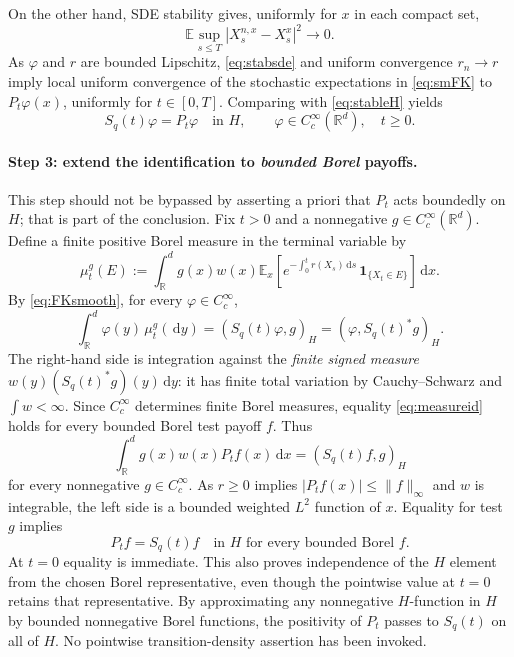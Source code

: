 \documentclass[11pt,a4paper]{article}
\theoremstyle{definition}\newtheorem{definition}{Definition}[section]\newtheorem{example}[theorem]{Example}
\theoremstyle{remark}\newtheorem{remark}[theorem]{Remark}\newtheorem{remarkSix}{Remark}[section]
\newcommand{\Rd}{\mathbb R^d}
\newcommand{\E}{\mathbb E}
\newcommand{\Cc}{C_c^\infty}
\newcommand{\dd}{\,\mathrm d}
\newcommand{\norm}[1]{\lVert #1\rVert}
\begin{document}
On the other hand, SDE stability gives, uniformly for $x$ in each compact set,
\begin{equation}\label{eq:stabsde}
 \E\sup_{s\le T}|X_s^{n,x}-X_s^x|^2\longrightarrow0.
\end{equation}
As $\varphi$ and $r$ are bounded Lipschitz, \eqref{eq:stabsde} and uniform convergence $r_n\to r$ imply local uniform convergence of the stochastic expectations in \eqref{eq:smFK} to $P_t\varphi(x)$, uniformly for $t\in[0,T]$. Comparing with \eqref{eq:stableH} yields
\begin{equation}\label{eq:FKsmooth}
 S_q(t)\varphi=P_t\varphi\quad\text{in }H,
 \qquad \varphi\in\Cc(\Rd),\quad t\ge0.
\end{equation}

\paragraph{Step 3: extend the identification to \emph{bounded Borel} payoffs.}
This step should not be bypassed by asserting a priori that $P_t$ acts boundedly on $H$; that is part of the conclusion. Fix $t>0$ and a nonnegative $g\in\Cc(\Rd)$. Define a finite positive Borel measure in the terminal variable by
\begin{equation}\label{eq:measuremu}
 \mu^g_t(E):=\int_\Rd g(x)w(x)\E_x\left[
 e^{-\int_0^t r(X_s)\dd s}\,\mathbf1_{\{X_t\in E\}}
 \right]\dd x.
\end{equation}
By \eqref{eq:FKsmooth}, for every $\varphi\in\Cc$,
\begin{equation}\label{eq:measureid}
 \int_\Rd\varphi(y)\,\mu_t^g(\dd y)
 =(S_q(t)\varphi,g)_H
 =(\varphi,S_q(t)^*g)_H.
\end{equation}
The right-hand side is integration against the \emph{finite signed measure} $w(y)(S_q(t)^*g)(y)\dd y$: it has finite total variation by Cauchy--Schwarz and $\int w<\infty$. Since $C_c^\infty$ determines finite Borel measures, equality \eqref{eq:measureid} holds for every bounded Borel test payoff $f$. Thus
\begin{equation}\label{eq:weakid}
 \int_\Rd g(x)w(x)P_tf(x)\dd x
 =(S_q(t)f,g)_H
\end{equation}
for every nonnegative $g\in\Cc$. As $r\ge0$ implies $|P_tf(x)|\le\norm f_\infty$ and $w$ is integrable, the left side is a bounded weighted $L^2$ function of $x$. Equality for test $g$ implies
\begin{equation}\label{eq:FKall}
 \boxed{\quad P_tf=S_q(t)f\quad\text{in }H
 \text{ for every bounded Borel }f.\quad}
\end{equation}
At $t=0$ equality is immediate. This also proves independence of the $H$ element from the chosen Borel representative, even though the pointwise value at $t=0$ retains that representative. By approximating any nonnegative $H$-function in $H$ by bounded nonnegative Borel functions, the positivity of $P_t$ passes to $S_q(t)$ on all of $H$. No pointwise transition-density assertion has been invoked.
\end{document}
